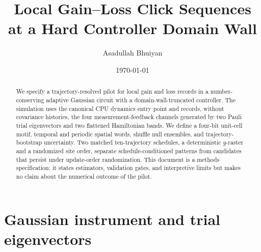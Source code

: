 \documentclass[aps,prb,onecolumn,nofootinbib,superscriptaddress]{revtex4-2}
\begin{document}
\title{\texorpdfstring{Local Gain--Loss Click Sequences at a Hard Controller Domain Wall}{Local Gain--Loss Click Sequences at a Hard Controller Domain Wall}}
\author{Asadullah Bhuiyan}
\date{\today}

\begin{abstract}
We specify a trajectory-resolved pilot for local gain and loss records in a
number-conserving adaptive Gaussian circuit with a domain-wall-truncated
controller.  The simulation uses the canonical CPU dynamics entry point and
records, without covariance histories, the four measurement-feedback channels
generated by two Pauli trial eigenvectors and two flattened Hamiltonian bands.
We define a four-bit unit-cell motif, temporal and periodic spatial words,
shuffle null ensembles, and trajectory-bootstrap uncertainty.  Two matched
ten-trajectory schedules, a deterministic \(y\)-raster and a randomized site
order, separate schedule-conditioned patterns from candidates that persist
under update-order randomization.  This document is a methods specification:
it states estimators, validation gates, and interpretive limits but makes no
claim about the numerical outcome of the pilot.
\end{abstract}

\maketitle
\setcounter{tocdepth}{2}
\tableofcontents

\section{Gaussian instrument and trial eigenvectors}
\end{document}
